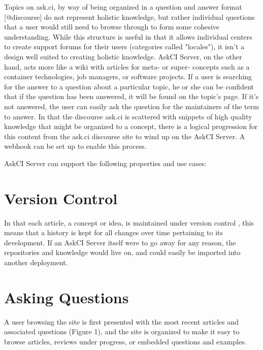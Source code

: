 \documentclass{jors}
\begin{document}
Topics on ask.ci, by way of being organized in a question and answer format [@discourse] do not represent holistic knowledge, but rather individual questions that a user would still need to browse through to form some cohesive understanding. While this structure is useful in that it allows individual centers to create support forums for their users (categories called "locales"), it isn't a design
well suited to creating holistic knowledge. AskCI Server, on the other hand, acts more like a wiki with articles for meta- or super- concepts such as a container technologies, job managers, or software projects. If a user is searching for the answer to a question about a particular topic, he or she can be confident that if the question has been answered, it will be found on the topic's page. If it's not answered, the user can easily ask the question for the maintainers of the term to answer. In that the discourse ask.ci is scattered with snippets of high quality knowledge that might be organized to a concept, there is a logical progression for this content from the ask.ci discourse site to wind up on the AskCI Server. A webhook can be set up to enable this process. 

AskCI Server can support the following properties and use cases:

\thispagestyle{empty} 
\section*{Version Control}

In that each article, a concept or idea, is maintained under version control \cite{github}, this means that 
a history is kept for all changes over time pertaining to its development. If an AskCI Server itself
were to go away for any reason, the repositories and knowledge would live on, and could easily be imported
into another deployment.

\section*{Asking Questions}

A user browsing the site is first presented with the most recent articles and associated questions (Figure 1),
and the site is organized to make it easy to browse articles, reviews under progress, or embedded questions and examples.
\end{document}
